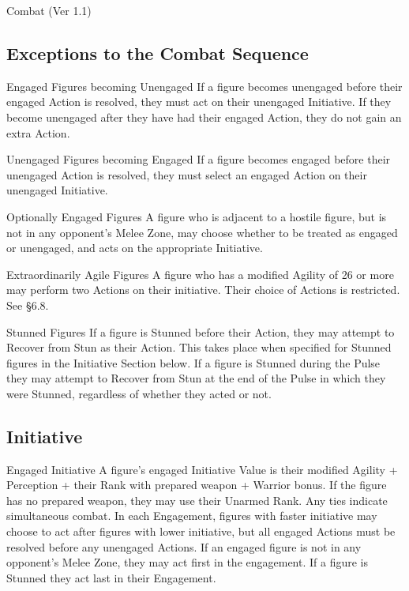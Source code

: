 \begin{Chapter}{Combat (Ver 1.1)}
\begin{Enumerate}
\end{Enumerate}

\subsection{Exceptions to the Combat Sequence}

\begin{Description}

\item[Engaged Figures becoming Unengaged] If a figure becomes
  unengaged before their engaged Action is resolved, they must act on
  their unengaged Initiative.  If they become unengaged after they
  have had their engaged Action, they do not gain an extra Action.

\item[Unengaged Figures becoming Engaged] If a figure becomes engaged
  before their unengaged Action is resolved, they must select an
  engaged Action on their unengaged Initiative.

\item[Optionally Engaged Figures] A figure who is adjacent to a
  hostile figure, but is not in any opponent’s Melee Zone, may choose
  whether to be treated as engaged or unengaged, and acts on the
  appropriate Initiative.

\item[Extraordinarily Agile Figures] A figure who has a modified
  Agility of 26 or more may perform two Actions on their
  initiative. Their choice of Actions is restricted. See §6.8.

\item[Stunned Figures] If a figure is Stunned before their Action,
  they may attempt to Recover from Stun as their Action.  This takes
  place when specified for Stunned figures in the Initiative Section
  below. If a figure is Stunned during the Pulse they may attempt to
  Recover from Stun at the end of the Pulse in which they were
  Stunned, regardless of whether they acted or not.

\end{Description}

\subsection{Initiative}

\begin{Description}
  
\item[Engaged Initiative] A figure’s engaged Initiative Value is their
  modified Agility + Perception + their Rank with prepared weapon +
  Warrior bonus.  If the figure has no prepared weapon, they may use
  their Unarmed Rank.  Any ties indicate simultaneous combat.  In each
  Engagement, figures with faster initiative may choose to act after
  figures with lower initiative, but all engaged Actions must be
  resolved before any unengaged Actions.  If an engaged figure is not
  in any opponent’s Melee Zone, they may act first in the engagement.
  If a figure is Stunned they act last in their Engagement.


\end{Description}
\end{Chapter}

